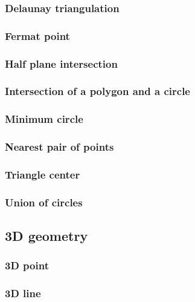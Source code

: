 \documentclass[titlepage,a4paper,10pt]{article}
\begin{document}
\begin{multicols}{2}
\begin{spacing}{0.8}
{				\subsubsection{Delaunay triangulation}
					
				\subsubsection{Fermat point}
					
				\subsubsection{Half plane intersection}
					
				\subsubsection{Intersection of a polygon and a circle}
					
				\subsubsection{Minimum circle}
					
				\subsubsection{Nearest pair of points}
					
				\subsubsection{Triangle center}
					
				\subsubsection{Union of circles}
					
			\subsection{3D geometry}
				\subsubsection{3D point}
					
				\subsubsection{3D line}
					
}
\end{spacing}
\end{multicols}
\end{document}
